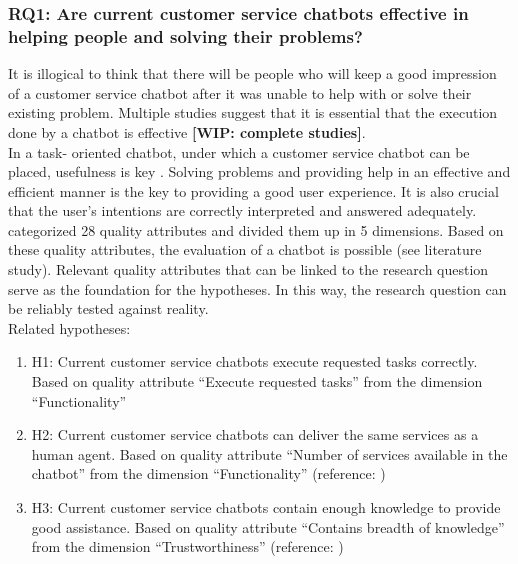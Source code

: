 \subsubsection{RQ1: Are current customer service chatbots effective in helping people and solving their problems?}
It is illogical to think that there will be people who will keep a good impression of a customer service chatbot after it was unable to help with or solve their existing problem. Multiple studies suggest that it is essential that the execution done by a chatbot is effective \textbf{[WIP: complete studies]}.\\
In a task- oriented chatbot, under which a customer service chatbot can be placed, usefulness is key \citep{brandtzaeg2020}. Solving problems and providing help in an effective and efficient manner is the key to providing a good user experience. It is also crucial that the user's intentions are correctly interpreted and answered adequately.\\
\break
\citep{Verkeyn2018} categorized 28 quality attributes and divided them up in 5 dimensions. Based on these quality attributes, the evaluation of a chatbot is possible (see literature study). Relevant quality attributes that can be linked to the research question serve as the foundation for the hypotheses. In this way, the research question can be reliably tested against reality.\\
\break
\break
Related hypotheses:
\begin{enumerate}
	\item H1: Current customer service chatbots execute requested tasks correctly. Based on \citep{Verkeyn2018} quality attribute “Execute requested tasks” from the dimension “Functionality”
	\item H2: Current customer service chatbots can deliver the same services as a human agent. Based on \citep{Verkeyn2018} quality attribute “Number of services available in the chatbot” from the dimension “Functionality” (reference: \citep{Eeuwen2017})
	\item H3: Current customer service chatbots contain enough knowledge to provide good assistance. Based on \citep{Verkeyn2018} quality attribute “Contains breadth of knowledge” from the dimension “Trustworthiness” (reference: \citep*{Cohen2016, Kuligowska2015})
\end{enumerate}

